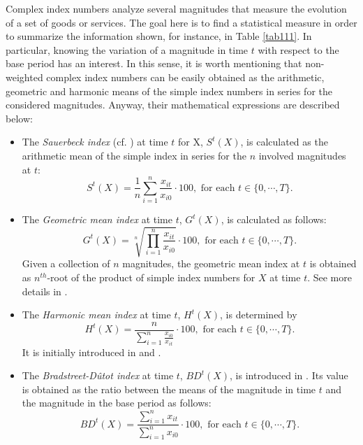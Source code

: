 Complex index numbers analyze several magnitudes that measure the evolution of a set of goods or services. The goal here is to find a statistical measure in order to summarize the information shown, for instance, in Table \ref{tab111}. In particular, knowing the variation of a magnitude in time $t$ with respect to the base period has an interest. In this sense, it is worth mentioning that non-weighted complex index numbers can be easily obtained as the arithmetic, geometric and harmonic means of the simple index numbers in series for the considered magnitudes. Anyway, their mathematical expressions are described below:
\begin{itemize}
\item The \emph{Sauerbeck index} (cf. \citealp{sauerbeck1895index}) at time $t$ for X, $S^t(X)$, is calculated as the arithmetic mean of the simple index in series for the $n$ involved magnitudes at $t$:
\begin{equation}\label{niSauerbeck}S^t(X)=\frac{1}{n}\sum_{i=1}^n \frac{x_{it}}{x_{i0}}\cdot 100,\mbox{ for each }t\in\{0,\cdots,T\}.\end{equation}
\item The \emph{Geometric mean index} at time $t$, $G^t(X)$, is calculated as follows:
\begin{equation}\label{niGeometric}G^t(X)=\sqrt[n]{\prod_{i=1}^n \frac{x_{it}}{x_{i0}}}\cdot 100,\mbox{ for each }t\in\{0,\cdots,T\}.\end{equation}
Given a collection of $n$ magnitudes, the geometric mean index at $t$ is obtained as $n^{th}$-root of the product of simple index numbers for $X$ at time $t$. See more details in \cite{jevons1863serious}.
\item The \emph{Harmonic mean index} at time $t$, $H^t(X)$, is determined by
\begin{equation}\label{niHarmonic}H^t(X)=\frac{n}{\sum_{i=1}^n\frac{x_{i0}}{x_{it}}}\cdot 100,\mbox{ for each }t\in\{0,\cdots,T\}.\end{equation}
It is initially introduced in \cite{jevons1865variation} and \cite{coggeshall1886arithmetic}.
\item The \emph{Bradstreet-D\^utot index} at time $t$, $BD^t(X)$, is introduced in \cite{walsh1901measurement}. Its value is obtained as the ratio between the means of the magnitude in time $t$ and the magnitude in the base period as follows:
\begin{equation}\label{niBDutot}BD^t(X)=\frac{\sum_{i=1}^n x_{it}}{\sum_{i=1}^n x_{i0}}\cdot 100,\mbox{ for each }t\in\{0,\cdots,T\}.\end{equation}
\end{itemize}

